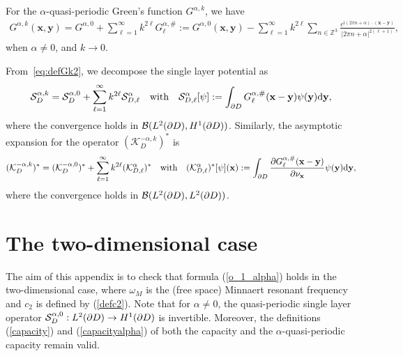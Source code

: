 \documentclass[11pt]{article}
\numberwithin{equation}{section}
\def\bx{{\mathbf{x}}}
\def\by{{\mathbf{y}}}
\def\rd{{\mathrm{d}}}
\def\ri{{\mathrm{i}}}
\def\cS{{\mathcal{S}}}
\def\cK{{\mathcal{K}}}
\newcommand\1{{\ensuremath {\mathds 1} }}
\begin{document}
{{For the $\alpha$-quasi-periodic Green's function $G^{\alpha,k}$, we have
\begin{align}
G^{\alpha,k}(\bx,\by)=G^{\alpha,0}+ \sum_{\ell=1}^\infty k^{2\ell} G_\ell^{\alpha,\#}:= G^{\alpha,0}(\bx,\by) - \sum_{\ell=1}^\infty k^{2\ell}\sum_{n\in\mathbb{Z}^3} \frac{e^{\ri (2\pi n + \alpha)\cdot (\bx-\by)}}{|2\pi n +\alpha|^{2(\ell+1)}}, \label{eq:defGk2}
\end{align}
when $\alpha \ne 0$, and $k \rightarrow 0$.

From~\eqref{eq:defGk2}, we decompose the single layer potential as
\begin{equation} \label{series-s2}
\mathcal{S}_{D}^{\alpha,k} =  \cS_D^{\alpha, 0} + \sum_{\ell=1}^\infty k^{2\ell }\cS_{D,\ell}^{\alpha} \quad \text{with} \quad \cS_{D,\ell}^\alpha[\psi] := \int_{\p D} G_\ell^{\alpha,\#}(\bx - \by) \psi(\by) \rd \by,
\end{equation}
where the convergence holds in $\mathcal{B}(L^2(\partial D), H^1(\partial D))$. Similarly, the asymptotic expansion for the operator $\left(\mathcal{K}_{D}^{-\alpha,k}\right)^*$ is
\begin{equation} \label{series-k2}
(\mathcal{K}_{D}^{-\alpha,k})^*   =( \cK_D^{-\alpha,0})^* + \sum_{\ell=1}^\infty k^{2\ell} (\cK_{D,\ell}^{\alpha})^* \quad \text{with} \quad  (\cK_{D,\ell}^\alpha)^*[\psi] (\bx):= \int_{\p D} \dfrac{ \p G_\ell^{\alpha,\#}(\bx - \by)}{\p \nu_\bx} \psi(\by) \rd \by,
\end{equation}
where the convergence holds in $\mathcal{B}(L^2(\partial D), L^2(\partial D))$.


\section{The two-dimensional case} \label{sec-appendix-2}

The aim of this appendix is to check that formula (\ref{o_1_alpha}) holds in the two-dimensional case, where $\omega_M$ is the (free space) Minnaert resonant frequency and $c_2$ is defined by (\ref{defc2}).
Note that for $\alpha\neq 0$,  the quasi-periodic single layer operator $\mathcal{S}_D^{\alpha,0} : L^2(\partial D) \rightarrow H^1(\partial D)$ is invertible. Moreover, the definitions (\ref{capacity})  and (\ref{capacityalpha})  of both the capacity and the $\alpha$-quasi-periodic capacity remain valid. 


}}
\end{document}
